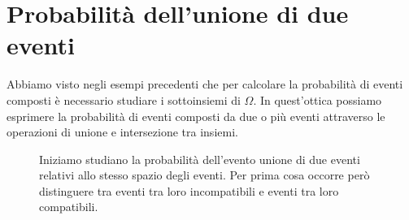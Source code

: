 \section{Probabilità dell'unione di due eventi}
\label{sec:03_unione}

Abbiamo visto negli esempi precedenti che per calcolare la probabilità di 
eventi composti è necessario studiare i sottoinsiemi di \(\Omega\). In 
quest'ottica possiamo esprimere la probabilità di eventi composti da due o 
più 
eventi attraverso le operazioni di unione e intersezione tra insiemi.
\begin{inaccessibleblock}
 \begin{figure}[htpb]
\begin{minipage}[c]{.35\textwidth}

\end{minipage}\hfil
\begin{minipage}[c]{.55\textwidth}
Iniziamo studiano la probabilità dell'evento unione di due eventi relativi 
allo 
stesso spazio degli eventi.
Per prima cosa occorre però distinguere tra eventi tra loro incompatibili e 
eventi tra loro compatibili.
\end{minipage}
\end{figure}
\end{inaccessibleblock}




